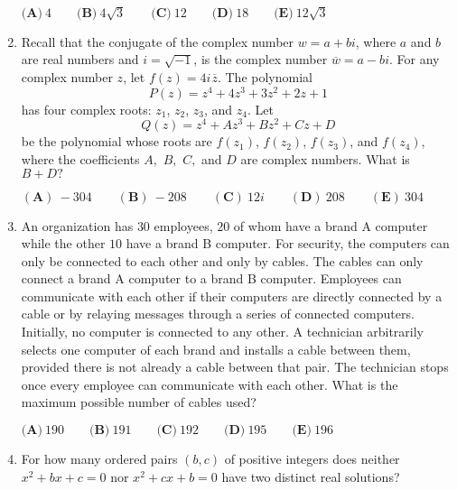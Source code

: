 \documentclass{article}
\begin{document}
\begin{enumerate}[label=\arabic*., itemsep=0.5em]
\(\textbf{(A)} \: 4 \qquad \textbf{(B)} \: 4\sqrt3 \qquad \textbf{(C)} \: 12 \qquad \textbf{(D)} \: 18 \qquad \textbf{(E)} \: 12\sqrt3\)\par \vspace{0.5em}\item Recall that the conjugate of the complex number \(w = a + bi\), where \(a\) and \(b\) are real numbers and \(i = \sqrt{-1}\), is the complex number \(\overline{w} = a - bi\). For any complex number \(z\), let \(f(z) = 4i\hspace{1pt}\overline{z}\). The polynomial 
\begin{equation*}
P(z) = z^4 + 4z^3 + 3z^2 + 2z + 1
\end{equation*}
 has four complex roots: \(z_1\), \(z_2\), \(z_3\), and \(z_4\). Let 
\begin{equation*}
Q(z) = z^4 + Az^3 + Bz^2 + Cz + D
\end{equation*}
 be the polynomial whose roots are \(f(z_1)\), \(f(z_2)\), \(f(z_3)\), and \(f(z_4)\), where the coefficients \(A,\) \(B,\) \(C,\) and \(D\) are complex numbers. What is \(B + D?\)

\((\textbf{A})\: {-}304\qquad(\textbf{B}) \: {-}208\qquad(\textbf{C}) \: 12i\qquad(\textbf{D}) \: 208\qquad(\textbf{E}) \: 304\)\par \vspace{0.5em}\item An organization has \(30\) employees, \(20\) of whom have a brand A computer while the other \(10\) have a brand B computer. For security, the computers can only be connected to each other and only by cables. The cables can only connect a brand A computer to a brand B computer. Employees can communicate with each other if their computers are directly connected by a cable or by relaying messages through a series of connected computers. Initially, no computer is connected to any other. A technician arbitrarily selects one computer of each brand and installs a cable between them, provided there is not already a cable between that pair. The technician stops once every employee can communicate with each other. What is the maximum possible number of cables used?

\(\textbf{(A)}\ 190  \qquad\textbf{(B)}\  191 \qquad\textbf{(C)}\  192 \qquad\textbf{(D)}\
 195 \qquad\textbf{(E)}\ 196\)\par \vspace{0.5em}\item For how many ordered pairs \((b,c)\) of positive integers does neither \(x^2+bx+c=0\) nor \(x^2+cx+b=0\) have two distinct real solutions?


\end{enumerate}
\end{document}
